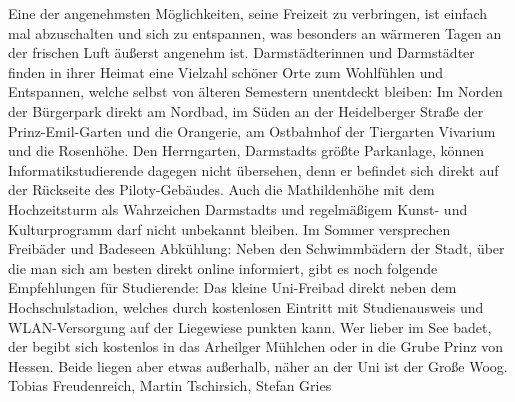 {Eine der angenehmsten Möglichkeiten, seine Freizeit zu verbringen, ist einfach mal abzuschalten und sich zu entspannen, was besonders an wärmeren Tagen an der frischen Luft äußerst angenehm ist.
}{
Darmstädterinnen und Darmstädter finden in ihrer Heimat eine Vielzahl schöner Orte zum Wohlfühlen und Entspannen, welche selbst von älteren Semestern unentdeckt bleiben: Im Norden der Bürgerpark direkt am Nordbad, im Süden an der Heidelberger Straße der Prinz-Emil-Garten und die Orangerie, am Ostbahnhof der Tiergarten Vivarium und die Rosenhöhe.
Den Herrngarten, Darmstadts größte Parkanlage, können Informatikstudierende dagegen nicht übersehen, denn er befindet sich direkt auf der Rückseite des Piloty-Gebäudes. Auch die Mathildenhöhe mit dem Hochzeitsturm als Wahrzeichen Darmstadts und regelmäßigem Kunst- und Kulturprogramm darf nicht unbekannt bleiben.
Im Sommer versprechen Freibäder und Badeseen Abkühlung: Neben den Schwimmbädern der Stadt, über die man sich am besten direkt online informiert, gibt es noch folgende Empfehlungen für Studierende: Das kleine Uni-Freibad direkt neben dem Hochschulstadion, welches durch kostenlosen Eintritt mit Studienausweis und WLAN-Versorgung auf der Liegewiese punkten kann. 
Wer lieber im See badet, der begibt sich kostenlos in das Arheilger Mühlchen oder in die Grube Prinz von Hessen. Beide liegen aber etwas außerhalb, näher an der Uni ist der Große Woog.
}
{Tobias Freudenreich, Martin Tschirsich, Stefan Gries}
\newpage